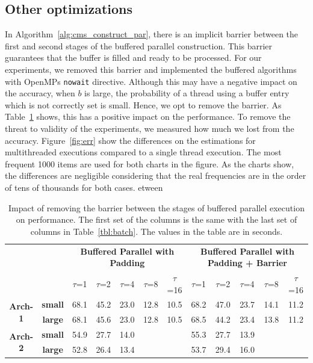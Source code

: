 \documentclass[10pt, conference, compsocconf]{IEEEtran}
\begin{document}
\subsection{Other optimizations}

In Algorithm~\ref{alg:cms_construct_par}, there is an implicit barrier between the first and second stages of the buffered parallel construction. This barrier guarantees that the buffer is filled and ready to be processed. For our experiments, we removed this barrier and implemented the buffered algorithms with OpenMPs {\tt nowait} directive. Although this may have a negative impact on the accuracy, when $b$ is large, the probability of a thread using a buffer entry which is not correctly set is small. Hence, we opt to remove the barrier. As Table~\ref{tbl:barrier} shows, this has a positive impact on the performance. To remove the threat to validity of the experiments, we measured how much we lost from the accuracy. Figure~\ref{fig:err} show the differences on the estimations for multithreaded executions compared to a single thread execution. The most frequent 1000 items are used for both charts in the figure. As the charts show, the differences are negligible considering that the real frequencies are in the order of tens of thousands for both cases.   
etween 
\begin{table}[]
\centering
{\def\arraystretch{1.3}
\begin{tabular}{cc||ccccc|ccccc}
                                 &                 & \multicolumn{5}{c|}{\textbf{Buffered Parallel with Padding}} & \multicolumn{5}{c}{\textbf{Buffered Parallel with Padding + Barrier}} \\
                                   &                 & $\tau$=1   & $\tau$=2    & $\tau$=4    & $\tau$=8    & $\tau$=16  & $\tau$=1   & $\tau$=2   & $\tau$=4   & $\tau$=8   & $\tau$=16 \\ \hline
\multirow{2}{*}{\textbf{Arch-1}} 	 &\textbf{small}  	&68.1  & 45.2  & 23.0    & 12.8  & 10.5	&68.2	&47.0	&23.7	&14.1	&11.2	\\
	& \textbf{large} 	& 68.1  & 45.6  & 23.0    & 12.8  & 10.5 	&68.5	&44.2	&23.4	&13.8	&11.2	\\ \hline
\multirow{2}{*}{\textbf{Arch-2}} & \textbf{small}  & 54.9  & 27.7  & 14.0   &       &       & 55.3  & 27.7  & 13.9 &      &      \\
                                 & \textbf{large} & 52.8  & 26.4  & 13.4  &       &       & 53.7  & 29.4  & 16.0 &      &     
\end{tabular}
}
\caption{Impact of removing the barrier between the stages of buffered parallel execution on performance. The first set of the columns is the same with the last set of columns in Table~\ref{tbl:batch}. The values in the table are in seconds.}
\label{tbl:barrier}
\end{table}
\end{document}
